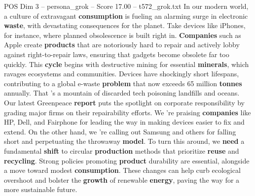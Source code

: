 \begin{textsample}{POS Dim 3 – persona\_grok – Score 17.00 – t572\_grok.txt}  \label{ex:f3_pos_038}
In our modern world, a culture of extravagant \textbf{consumption} is fueling an alarming surge in electronic \textbf{waste}, with devastating consequences for the planet.
Take devices like iPhones, for instance, where planned obsolescence is built right in. \textbf{Companies} such as Apple create \textbf{products} that are notoriously hard to repair and actively lobby against right-to-repair laws, ensuring that gadgets become obsolete far too quickly.
This \textbf{cycle} begins with destructive mining for essential \textbf{minerals}, which ravages ecosystems and communities.
Devices have shockingly short lifespans, contributing to a global e-waste \textbf{problem} that now exceeds 65 million \textbf{tonnes} annually.
That 's a mountain of discarded tech poisoning landfills and oceans.
Our latest Greenpeace \textbf{report} puts the spotlight on corporate responsibility by grading major firms on their repairability efforts.
We 're praising \textbf{companies} like HP, Dell, and Fairphone for leading the way in making devices easier to fix and extend.
On the other hand, we 're calling out Samsung and others for falling short and perpetuating the throwaway \textbf{model}.
To turn this around, we \textbf{need} a fundamental \textbf{shift} to circular \textbf{production} methods that prioritize \textbf{reuse} and \textbf{recycling}.
Strong policies promoting \textbf{product} durability are essential, alongside a move toward modest \textbf{consumption}.
These changes can help curb ecological overshoot and bolster the \textbf{growth} of renewable \textbf{energy}, paving the way for a more sustainable future.

\end{textsample}
